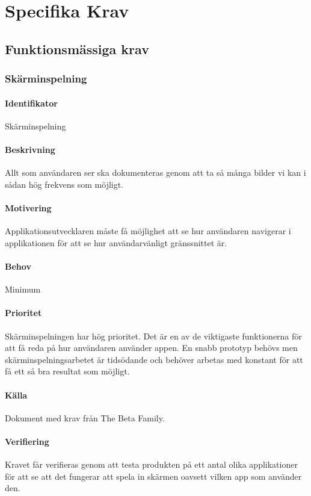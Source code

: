 \section{Specifika Krav}

\subsection{Funktionsmässiga krav}

\subsubsection{Skärminspelning}
\paragraph{Identifikator}
Skärminspelning
\paragraph{Beskrivning}
Allt som användaren ser ska dokumenteras genom att ta så många bilder vi kan i sådan hög frekvens som möjligt.
\paragraph{Motivering}
Applikationsutvecklaren måste få möjlighet att se hur användaren navigerar i applikationen för att se hur användarvänligt gränssnittet är.
\paragraph{Behov}
Minimum
\paragraph{Prioritet}
Skärminspelningen har hög prioritet. Det är en av de viktigaste funktionerna för att få reda på hur användaren använder appen. En snabb prototyp behövs men skärminspelningsarbetet är tidsödande och behöver arbetas med konstant för att få ett så bra resultat som möjligt.
\paragraph{Källa}
Dokument med krav från The Beta Family.
\paragraph{Verifiering}
Kravet får verifieras genom att testa produkten på ett antal olika applikationer för att se att det fungerar att spela in skärmen oavsett vilken app som använder den.

